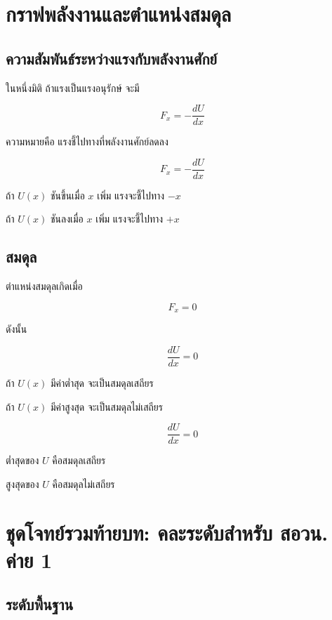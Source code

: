 \section{กราฟพลังงานและตำแหน่งสมดุล}

\subsection{ความสัมพันธ์ระหว่างแรงกับพลังงานศักย์}

ในหนึ่งมิติ ถ้าแรงเป็นแรงอนุรักษ์ จะมี

\[
F_x=-\frac{dU}{dx}
\]

ความหมายคือ แรงชี้ไปทางที่พลังงานศักย์ลดลง

\begin{tcolorbox}[title=แรงจากกราฟพลังงานศักย์]
\[
F_x=-\frac{dU}{dx}
\]

ถ้า $U(x)$ ชันขึ้นเมื่อ $x$ เพิ่ม แรงจะชี้ไปทาง $-x$

ถ้า $U(x)$ ชันลงเมื่อ $x$ เพิ่ม แรงจะชี้ไปทาง $+x$
\end{tcolorbox}

\subsection{สมดุล}

ตำแหน่งสมดุลเกิดเมื่อ

\[
F_x=0
\]

ดังนั้น

\[
\frac{dU}{dx}=0
\]

ถ้า $U(x)$ มีค่าต่ำสุด จะเป็นสมดุลเสถียร

ถ้า $U(x)$ มีค่าสูงสุด จะเป็นสมดุลไม่เสถียร

\begin{tcolorbox}[title=สมดุลจากกราฟพลังงาน]
\[
\frac{dU}{dx}=0
\]

ต่ำสุดของ $U$ คือสมดุลเสถียร

สูงสุดของ $U$ คือสมดุลไม่เสถียร
\end{tcolorbox}

\section{ชุดโจทย์รวมท้ายบท: คละระดับสำหรับ สอวน. ค่าย 1}

\subsection*{ระดับพื้นฐาน}

